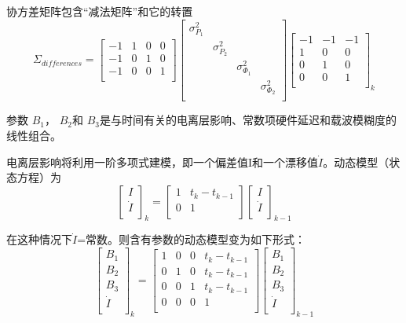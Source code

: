 协方差矩阵包含“减法矩阵”和它的转置
$$
\Sigma_{differences}
=
\begin{bmatrix}
-1&1&0&0\\
-1&0&1&0\\
-1&0&0&1\\
\end{bmatrix}
\begin{bmatrix}
\sigma_{P_{1}}^{2}& & & \\
& \sigma_{P_{2}}^{2} & &\\
& &\sigma_{\Phi_{1}}^{2} & \\
& & & \sigma_{\Phi_{2}}^{2} \\
\end{bmatrix}
\begin{bmatrix}
-1&-1&-1\\
1&0&0\\
0&1&0\\
0&0&1\\
\end{bmatrix}_{k}
$$

参数 $B_{1}$， $B_{2}$和 $B_{3}$是与时间有关的电离层影响、常数项硬件延迟和载波模糊度的线性组合。

电离层影响将利用一阶多项式建模，即一个偏差值I和一个漂移值$\dot{I}$。动态模型（状态方程）为
$$
\begin{bmatrix}
I\\
\dot{I}\\
\end{bmatrix}_{k}
=\begin{bmatrix}
1&t_{k}-t_{k-1}\\
0&1\\
\end{bmatrix}
\begin{bmatrix}
I\\
\dot{I}\\
\end{bmatrix}_{k-1}
$$

在这种情况下$\dot{I}$=常数。则含有参数的动态模型变为如下形式：
$$
\begin{bmatrix}
B_{1}\\
B_{2}\\
B_{3}\\
\dot{I}\\
\end{bmatrix}_{k}
=\begin{bmatrix}
1&0&0&t_{k}-t_{k-1}\\
0&1&0&t_{k}-t_{k-1}\\
0&0&1&t_{k}-t_{k-1}\\
0&0&0&1\\
\end{bmatrix}
\begin{bmatrix}
B_{1}\\
B_{2}\\
B_{3}\\
\dot{I}\\
\end{bmatrix}_{k-1}
$$


